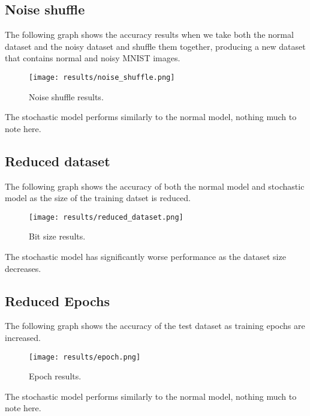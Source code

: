 \documentclass[a4paper,oneside,phd,etd]{BYUPhys}
\begin{document}
\vfill
\subsection{Noise shuffle}
The following graph shows the accuracy results when we take both the normal dataset and the noisy dataset and shuffle them together, producing a new dataset that contains normal and noisy MNIST images.
\begin{figure}[H]
\centering
\texttt{[image: results/noise\_shuffle.png]}
\caption{Noise shuffle results.}
\label{fig:noise_shuffle}
\end{figure}
The stochastic model performs similarly to the normal model, nothing much to note here.

\vfill
\subsection{Reduced dataset}
The following graph shows the accuracy of both the normal model and stochastic model as the size of the training datset is reduced.
\begin{figure}[H]
\centering
\texttt{[image: results/reduced\_dataset.png]}
\caption{Bit size results.}
\label{fig:dataset}
\end{figure}
The stochastic model has significantly worse performance as the dataset size decreases.

\vfill
\subsection{Reduced Epochs}
The following graph shows the accuracy of the test dataset as training epochs are increased.
\begin{figure}[H]
\centering
\texttt{[image: results/epoch.png]}
\caption{Epoch results.}
\label{fig:epoch}
\end{figure}
The stochastic model performs similarly to the normal model, nothing much to note here.
\end{document}
